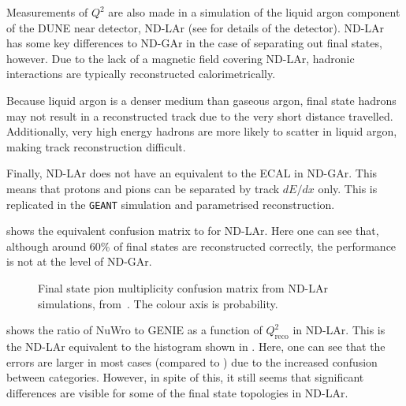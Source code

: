 Measurements of $Q^{2}$ are also made in a simulation of the liquid argon component of the DUNE near detector, ND-LAr (see  for details of the detector).
ND-LAr has some key differences to ND-GAr in the case of separating out final states, however. 
Due to the lack of a magnetic field covering ND-LAr, hadronic interactions are typically reconstructed calorimetrically.

Because liquid argon is a denser medium than gaseous argon, final state hadrons may not result in a reconstructed track due to the very short distance travelled.
Additionally, very high energy hadrons are more likely to scatter in liquid argon, making track reconstruction difficult.

Finally, ND-LAr does not have an equivalent to the ECAL in ND-GAr.
This means that protons and pions can be separated by track $dE/dx$ only.
This is replicated in the \texttt{GEANT} simulation and parametrised reconstruction.

 shows the equivalent confusion matrix to  for ND-LAr.
Here one can see that, although around 60\% of final states are reconstructed correctly, the performance is not at the level of ND-GAr.

\begin{figure}[h]
	\begin{adjustbox}{max totalsize=.6\linewidth, center}
		
	\end{adjustbox}
	\caption[Final state pion multiplicity confusion matrix from ND-LAr simulations.]{Final state pion multiplicity confusion matrix from ND-LAr simulations, from~\cite{ndCdr}. The colour axis is probability.}
	\label{fig:larConfusMat}
\end{figure}

 shows the ratio of NuWro to GENIE as a function of $Q^{2}_{\textrm{reco}}$ in ND-LAr.
This is the ND-LAr equivalent to the histogram shown in . 
Here, one can see that the errors are larger in most cases (compared to ) due to the increased confusion between categories.
However, in spite of this, it still seems that significant differences are visible for some of the final state topologies in ND-LAr.

